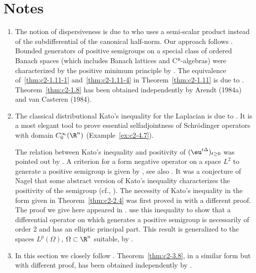 \section*{Notes}
\begin{enumerate}[label=\emph{Section \arabic*:}, wide]
\item   The notion of dispersiveness is due to \textcite{phillips:1962} who uses a semi-scalar product instead of the subdifferential of the canonical half-norm.
Our approach follows \textcite{arendtchernoffkato:1982}.
Bounded generators of positive semigroups on a special class of ordered Banach spaces (which includes Banach lattices and C*-algebras) were characterized by the positive minimum principle by \textcite{evanshancheolsen:1979}.
The equivalence of~\ref{thm:c2-1.11-1} and~\ref{thm:c2-1.11-4}  in Theorem~\ref{thm:c2-1.11}  is due to \textcite{nageluhlig:1981}.
Theorem~\ref{thm:c2-1.8}   has been obtained independently by Arendt (1984a) and van Casteren (1984).

\item  
The classical distributional Kato's inequality for the Laplacian is due to \textcite{kato:1973}.
It is a most elegant tool to prove essential selfadjointness of Schrödinger operators with domain $C^{\infty}_0(\R^n)$ (\cf Example~\ref{ex:c2-4.7}).

The relation between Kato's inequality and positivity of\/ $(\eu^{t\Delta})_{t \geq 0}$ was pointed out by \textcite{simon:1977}.
A criterion for a form negative operator on a space $L^{2}$ to generate a positive semigroup is given by \textcite{beurlingdeny:1958}, see also \textcite[Vol. IV, Section XIII.12]{reedsimon:1978}.
It was a conjecture of Nagel that some abstract version of
Kato's inequality characterizes the positivity of the semigroup (cf., \textcite{nageluhlig:1981}). The necessity of Kato's inequality in the form given in Theorem~\ref{thm:c2-2.4}   was first proved in \textcite[Remark 3.10]{arendt:1982} with a different proof. 
The proof we give here appeared in \textcite{arendt:1984a}. 
\textcite{miyajimaokazawa:1984} use this inequality to show that a differential operator on which generates a positive semigroup is necessarily of order 2 and has an elliptic principal part. 
This result is generalized to the spaces $L^p(\Omega)$, $\Omega \subset \R^n$ suitable, by \textcite{miyajima:1986}.

\item  In this section we closely follow \textcite{arendt:1984a}. Theorem~\ref{thm:c2-3.8}, in a similar form but with different proof, has been obtained independently by \textcite{schep:1985}.


\end{enumerate}
